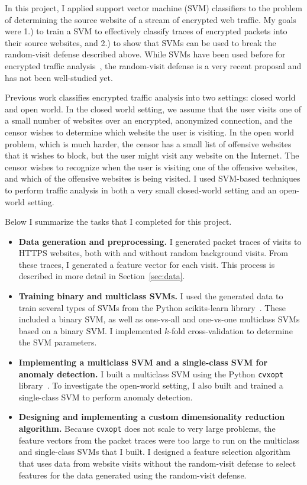 \documentclass[10pt, twocolumn]{article}
\begin{document}
In this project, I applied support vector machine (SVM) classifiers 
to the problem of determining the source website of a stream of 
encrypted web traffic. My goals were 1.) to train a SVM to 
effectively classify traces of encrypted packets into their source 
websites, and 2.) to show that SVMs can be used to break the random-visit 
defense described above. While SVMs have been used before for 
encrypted traffic analysis~\cite{torfingerprinting}, the random-visit defense 
is a very recent proposal and has not been well-studied yet.

Previous work classifies encrypted traffic analysis into two settings: 
closed world and open world. In the closed world setting, we assume that 
the user visits one of a small number of websites over an encrypted, 
anonymized connection, and the censor wishes to determine which website 
the user is visiting. In the open world problem, which is much harder, the 
censor has a small list of offensive websites that it wishes to block, but 
the user might visit any website on the Internet. The censor wishes to 
recognize when the user is visiting one of the offensive websites, and which 
of the offensive websites is being visited. I used SVM-based techniques to 
perform traffic analysis in both a very small closed-world setting and an 
open-world setting.

Below I summarize the tasks that I completed for this project.
\begin{itemize}
\item \textbf{Data generation and preprocessing.} I generated packet 
traces of visits to HTTPS websites, both with and without random 
background visits. From these traces, I generated a feature vector for 
each visit. This process is described in more detail in Section~\ref{sec:data}. 
\item \textbf{Training binary and multiclass SVMs.} I used the 
generated data to train several types of SVMs from the Python scikits-learn 
library~\cite{sklearn}. These included a binary SVM, as well as one-vs-all
and one-vs-one multiclass SVMs based on a binary SVM. I implemented $k$-fold cross-validation 
to determine the SVM parameters.
\item \textbf{Implementing a multiclass SVM and a single-class SVM for anomaly detection.} 
I built a multiclass SVM using the Python \texttt{cvxopt} library~\cite{cvxopt}.
 To investigate the 
open-world setting, I also built and trained a single-class SVM to perform 
anomaly detection.
\item \textbf{Designing and implementing a custom dimensionality reduction algorithm.} 
Because \texttt{cvxopt} does not scale to very large problems, the feature vectors from the 
packet traces were too large to run on the multiclass and single-class SVMs that I built. 
I designed a feature selection algorithm that uses data from website visits without the 
random-visit defense to select features for the data generated using the random-visit defense.
\end{itemize}
\end{document}
